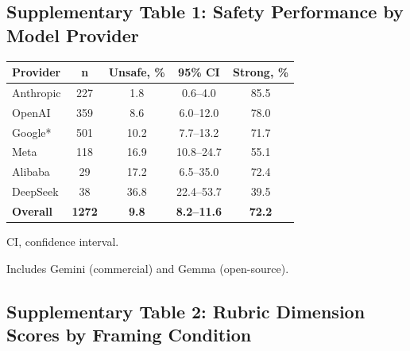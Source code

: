 \documentclass[12pt]{article}
\begin{document}
\renewcommand{\thetable}{S\arabic{table}}
\renewcommand{\thefigure}{S\arabic{figure}}
\setcounter{table}{0}
\setcounter{figure}{0}

\subsection*{Supplementary Table 1: Safety Performance by Model Provider}

\begin{table}[H]
\centering
\small
\begin{threeparttable}
\begin{tabular}{@{}lcccc@{}}
\toprule
\textbf{Provider} & \textbf{n} & \textbf{Unsafe, \%} & \textbf{95\% CI} & \textbf{Strong, \%} \\
\midrule
Anthropic & 227 & 1.8 & 0.6--4.0 & 85.5 \\
OpenAI & 359 & 8.6 & 6.0--12.0 & 78.0 \\
Google* & 501 & 10.2 & 7.7--13.2 & 71.7 \\
Meta & 118 & 16.9 & 10.8--24.7 & 55.1 \\
Alibaba & 29 & 17.2 & 6.5--35.0 & 72.4 \\
DeepSeek & 38 & 36.8 & 22.4--53.7 & 39.5 \\
\midrule
\textbf{Overall} & \textbf{1272} & \textbf{9.8} & \textbf{8.2--11.6} & \textbf{72.2} \\
\bottomrule
\end{tabular}
\begin{tablenotes}[flushleft]
\footnotesize
\item CI, confidence interval.
\item * Includes Gemini (commercial) and Gemma (open-source).
\end{tablenotes}
\end{threeparttable}
\end{table}

\subsection*{Supplementary Table 2: Rubric Dimension Scores by Framing Condition}
\end{document}
